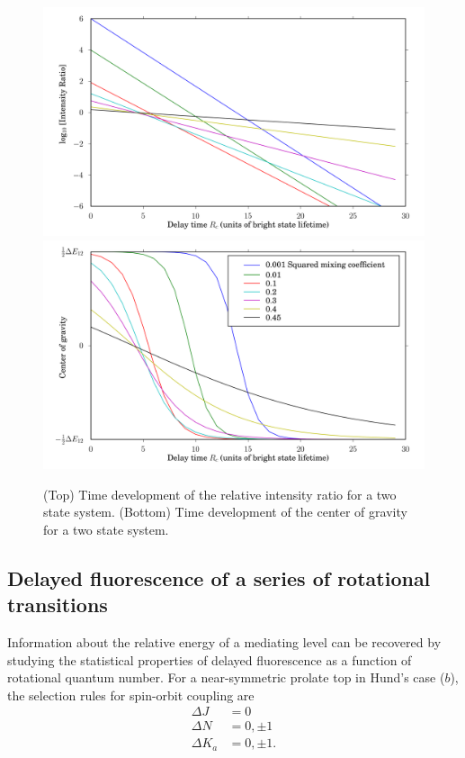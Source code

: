 \documentclass[12pt]{mitthesis}
\begin{document}
\begin{figure}
  \caption{(Top) Time development of the relative intensity ratio for
    a two state system. (Bottom) Time development of the center of
    gravity for a two state system.}
  \label{fig:cog-devel}
  \centering
  \includegraphics[width=6in]{ratio-development.png}
  \includegraphics[width=6in]{cog-development.png}
\end{figure}

\subsection{Delayed fluorescence of a series of rotational
  transitions}

Information about the relative energy of a mediating level can be
recovered by studying the statistical properties of delayed
fluorescence as a function of rotational quantum number.  For a
near-symmetric prolate top in Hund's case ($b$), the selection rules
for spin-orbit coupling are \cite{stevens73}
\begin{equation}
  \begin{split}
    \Delta J &= 0 \\
    \Delta N &= 0, \pm 1\\
    \Delta K_a &= 0, \pm 1.
  \end{split}
\end{equation}
\end{document}
